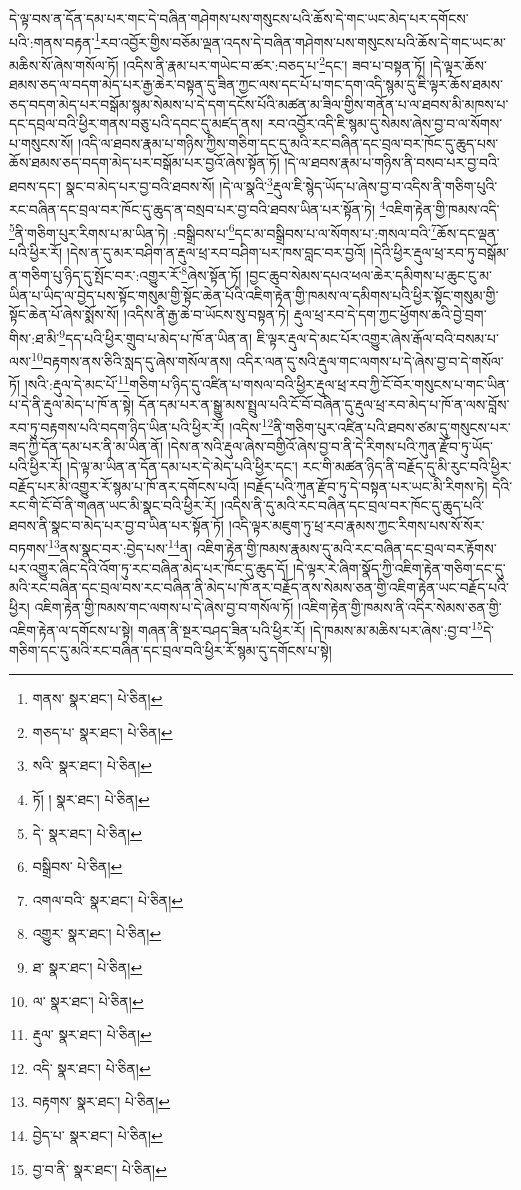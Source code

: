 དེ་ལྟ་བས་ན་དོན་དམ་པར་གང་དེ་བཞིན་གཤེགས་པས་གསུངས་པའི་ཆོས་དེ་གང་ཡང་མེད་པར་དགོངས་པའི་:གནས་བརྟན་\footnote{གནས་  སྣར་ཐང་།  པེ་ཅིན། }རབ་འབྱོར་གྱིས་བཅོམ་ལྡན་འདས་དེ་བཞིན་གཤེགས་པས་གསུངས་པའི་ཆོས་དེ་གང་ཡང་མ་མཆིས་སོ་ཞེས་གསོལ་ཏོ། །འདིས་ནི་རྣམ་པར་གཡེང་བ་ཚར་:བཅད་པ་\footnote{གཅད་པ་  སྣར་ཐང་།  པེ་ཅིན། }དང་། ཟབ་པ་བསྟན་ཏོ། །དེ་ལྟར་ཆོས་ཐམས་ཅད་ལ་བདག་མེད་པར་རྒྱ་ཆེར་བསྟན་དུ་ཟིན་ཀྱང་ལས་དང་པོ་པ་གང་དག་འདི་སྙམ་དུ་ཇི་ལྟར་ཆོས་ཐམས་ཅད་བདག་མེད་པར་བསྒོམ་སྙམ་སེམས་པ་དེ་དག་དངོས་པོའི་མཚན་མ་ཟིལ་གྱིས་གནོན་པ་ལ་ཐབས་མི་མཁས་པ་དང་དབྲལ་བའི་ཕྱིར་གནས་བཅུ་པའི་དབང་དུ་མཛད་ནས། རབ་འབྱོར་འདི་ཇི་སྙམ་དུ་སེམས་ཞེས་བྱ་བ་ལ་སོགས་པ་གསུངས་སོ། །འདི་ལ་ཐབས་རྣམ་པ་གཉིས་ཀྱིས་གཅིག་དང་དུ་མའི་རང་བཞིན་དང་བྲལ་བར་ཁོང་དུ་ཆུད་པས་ཆོས་ཐམས་ཅད་བདག་མེད་པར་བསྒོམ་པར་བྱའོ་ཞེས་སྟོན་ཏོ། །དེ་ལ་ཐབས་རྣམ་པ་གཉིས་ནི་བསབ་པར་བྱ་བའི་ཐབས་དང་། སྣང་བ་མེད་པར་བྱ་བའི་ཐབས་སོ། །དེ་ལ་སྣའི་\footnote{སའི་  སྣར་ཐང་།  པེ་ཅིན། }རྡུལ་ཇི་སྙེད་ཡོད་པ་ཞེས་བྱ་བ་འདིས་ནི་གཅིག་པུའི་རང་བཞིན་དང་བྲལ་བར་ཁོང་དུ་ཆུད་ན་བསྲབ་པར་བྱ་བའི་ཐབས་ཡིན་པར་སྟོན་ཏེ། \footnote{ཏོ། །   སྣར་ཐང་།  པེ་ཅིན། }འཇིག་རྟེན་གྱི་ཁམས་འདི་\footnote{དེ་  སྣར་ཐང་།  པེ་ཅིན། }ནི་གཅིག་པུར་རིགས་པ་མ་ཡིན་ཏེ། :བསྒྲིབས་པ་\footnote{བསྒྲིབས་  པེ་ཅིན། }དང་མ་བསྒྲིབས་པ་ལ་སོགས་པ་:གསལ་བའི་\footnote{འགལ་བའི་  སྣར་ཐང་།  པེ་ཅིན། }ཆོས་དང་ལྡན་པའི་ཕྱིར་རོ། །དེས་ན་དུ་མར་བཤིག་ན་རྡུལ་ཕྲ་རབ་བཤིག་པར་ཁས་བླང་བར་བྱའོ། །དེའི་ཕྱིར་རྡུལ་ཕྲ་རབ་ཏུ་བསྒོམ་ན་གཅིག་པུ་ཉིད་དུ་སྤོང་བར་:འགྱུར་རོ་\footnote{འགྱུར་  སྣར་ཐང་།  པེ་ཅིན། }ཞེས་སྟོན་ཏོ། །བྱང་ཆུབ་སེམས་དཔའ་ཕལ་ཆེར་དམིགས་པ་ཆུང་ངུ་མ་ཡིན་པ་ཡིད་ལ་བྱེད་པས་སྟོང་གསུམ་གྱི་སྟོང་ཆེན་པོའི་འཇིག་རྟེན་གྱི་ཁམས་ལ་དམིགས་པའི་ཕྱིར་སྟོང་གསུམ་གྱི་སྟོང་ཆེན་པོ་ཞེས་སྨོས་སོ། །འདིས་ནི་རྒྱ་ཆེ་བ་ཡོངས་སུ་བསྟན་ཏེ། རྡུལ་ཕྲ་རབ་དེ་དག་ཀྱང་ཕྱོགས་ཆའི་བྱེ་བྲག་གིས་:ཐ་མི་\footnote{ཐ་  སྣར་ཐང་།  པེ་ཅིན། }དད་པའི་ཕྱིར་གྲུབ་པ་མེད་པ་ཁོ་ན་ཡིན་ན། ཇི་ལྟར་རྡུལ་དེ་མང་པོར་འགྱུར་ཞེས་རྒོལ་བའི་བསམ་པ་ལས་\footnote{ལ་  སྣར་ཐང་།  པེ་ཅིན། }བརྟགས་ནས་ཅིའི་སླད་དུ་ཞེས་གསོལ་ནས། འདིར་ལན་དུ་སའི་རྡུལ་གང་ལགས་པ་དེ་ཞེས་བྱ་བ་དེ་གསོལ་ཏོ། །སའི་:རྡུལ་དེ་མང་པོ་\footnote{རྡུལ་  སྣར་ཐང་།  པེ་ཅིན། }གཅིག་པ་ཉིད་དུ་འཛིན་པ་གསལ་བའི་ཕྱིར་རྡུལ་ཕྲ་རབ་ཀྱི་ངོ་བོར་གསུངས་པ་གང་ཡིན་པ་དེ་ནི་རྡུལ་མེད་པ་ཁོ་ན་སྟེ། དོན་དམ་པར་ན་སྒྱུ་མས་སྤྲུལ་པའི་ངོ་བོ་བཞིན་དུ་རྡུལ་ཕྲ་རབ་མེད་པ་ཁོ་ན་ལས་བློས་རབ་ཏུ་བརྟགས་པའི་བདག་ཉིད་ཡིན་པའི་ཕྱིར་རོ། །འདིས་\footnote{འདི་  སྣར་ཐང་།  པེ་ཅིན། }ནི་གཅིག་པུར་འཛིན་པའི་ཐབས་ཙམ་དུ་གསུངས་པར་ཟད་ཀྱི་དོན་དམ་པར་ནི་མ་ཡིན་ནོ། །དེས་ན་སའི་རྡུལ་ཞེས་བགྱིའོ་ཞེས་བྱ་བ་ནི་དེ་རིགས་པའི་ཀུན་རྫོབ་ཏུ་ཡོད་པའི་ཕྱིར་རོ། །དེ་ལྟ་མ་ཡིན་ན་དོན་དམ་པར་དེ་མེད་པའི་ཕྱིར་དང་། རང་གི་མཚན་ཉིད་ནི་བརྗོད་དུ་མི་རུང་བའི་ཕྱིར་བརྗོད་པར་མི་འགྱུར་རོ་སྙམ་པ་ཁོ་ནར་དགོངས་པའོ། །བརྗོད་པའི་ཀུན་རྫོབ་ཏུ་དེ་བསྟན་པར་ཡང་མི་རིགས་ཏེ། དེའི་རང་གི་ངོ་བོ་ནི་གཞན་ཡང་མི་སྣང་བའི་ཕྱིར་རོ། །འདིས་ནི་དུ་མའི་རང་བཞིན་དང་བྲལ་བར་ཁོང་དུ་ཆུད་པའི་ཐབས་ནི་སྣང་བ་མེད་པར་བྱ་བ་ཡིན་པར་སྟོན་ཏོ། །འདི་ལྟར་མཇུག་ཏུ་ཕྲ་རབ་རྣམས་ཀྱང་རིགས་པས་སོ་སོར་བཏགས་\footnote{བརྟགས་  སྣར་ཐང་།  པེ་ཅིན། }ནས་སྣང་བར་:བྱེད་པས་\footnote{བྱེད་པ་  སྣར་ཐང་།  པེ་ཅིན། }ན། འཇིག་རྟེན་གྱི་ཁམས་རྣམས་དུ་མའི་རང་བཞིན་དང་བྲལ་བར་རྟོགས་པར་འགྱུར་ཞིང་དེའི་འོག་ཏུ་རང་བཞིན་མེད་པར་ཁོང་དུ་ཆུད་དོ། །དེ་ལྟར་རེ་ཞིག་སྣོད་ཀྱི་འཇིག་རྟེན་གཅིག་དང་དུ་མའི་རང་བཞིན་དང་བྲལ་བས་རང་བཞིན་ནི་མེད་པ་ཁོ་ནར་བརྗོད་ནས་སེམས་ཅན་གྱི་འཇིག་རྟེན་ཡང་བརྗོད་པའི་ཕྱིར། འཇིག་རྟེན་གྱི་ཁམས་གང་ལགས་པ་དེ་ཞེས་བྱ་བ་གསོལ་ཏོ། །འཇིག་རྟེན་གྱི་ཁམས་ནི་འདིར་སེམས་ཅན་གྱི་འཇིག་རྟེན་ལ་དགོངས་པ་སྟེ། གཞན་ནི་སྔར་བཤད་ཟིན་པའི་ཕྱིར་རོ། །དེ་ཁམས་མ་མཆིས་པར་ཞེས་:བྱ་བ་\footnote{བྱ་བ་ནི་  སྣར་ཐང་།  པེ་ཅིན། }དེ་གཅིག་དང་དུ་མའི་རང་བཞིན་དང་བྲལ་བའི་ཕྱིར་རོ་སྙམ་དུ་དགོངས་པ་སྟེ། 
